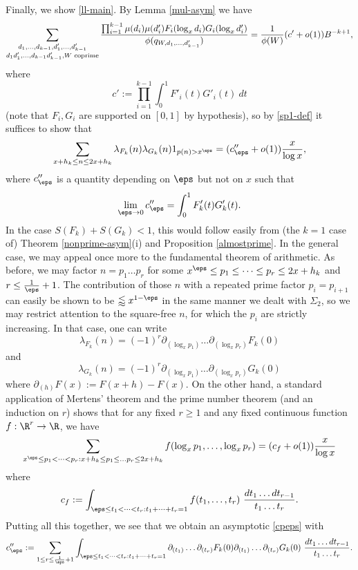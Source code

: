 Finally, we show \eqref{ll-main}.  By Lemma \ref{mul-asym} we have
$$
 \sum_{\substack{ d_1,\dots,d_{k-1},d'_1,\dots,d'_{k-1}\\ d_1d'_1,\dots,d_{k-1}d'_{k-1}, W \text{ coprime}}} \hspace{0pt minus 1fil}\frac{\prod_{i=1}^{k-1} \mu(d_{i}) \mu(d'_{i}) F_{i}(\log_x d_{i}) G_{i}(\log_x d'_{i}) }{\phi(q_{W,d_1,\dots,d'_{k-1}})} = \frac{1}{\phi(W)} (c'+o(1)) B^{-k+1},$$
where
$$ c' := \prod_{i=1}^{k-1} \int_0^1 F'_i(t) G'_i(t)\ dt$$
(note that $F_i, G_i$ are supported on $[0,1]$ by hypothesis), so by \eqref{sp1-def} it suffices to show that
\begin{equation}\label{cpeps}
\sum_{x+h_k \leq n \leq 2x+h_k} \lambda_{F_k}(n) \lambda_{G_k}(n) 1_{p(n)>x^\eps} = (c''_\eps + o(1)) \frac{x}{\log x},
\end{equation}
where $c''_{\eps}$ is a quantity depending on $\eps$ but not on $x$ such that
$$ \lim_{\eps \to 0} c''_{\eps} = \int_0^1 F'_k(t) G'_k(t).$$
In the case $S(F_k)+S(G_k) < 1$, this would follow easily from (the $k=1$ case of) Theorem \ref{nonprime-asym}(i) and Proposition \ref{almostprime}.  In the general case, we may appeal once more to the fundamental theorem of arithmetic.  As before, we may factor $n = p_1 \dots p_r$ for some $x^\eps \leq p_1 \leq \dots \leq p_r \leq 2x+h_k$ and $r \leq \frac{1}{\eps}+1$.  The contribution of those $n$ with a repeated prime factor $p_i = p_{i+1}$ can easily be shown to be $\lessapprox x^{1-\eps}$ in the same manner we dealt with $\Sigma_2$, so we may restrict attention to the square-free $n$, for which the $p_i$ are strictly increasing.  In that case, one can write
$$ \lambda_{F_k}(n) = (-1)^r \partial_{(\log_x p_1)} \dots \partial_{(\log_x p_r)} F_k(0)$$
and
$$ \lambda_{G_k}(n) = (-1)^r \partial_{(\log_x p_1)} \dots \partial_{(\log_x p_r)} G_k(0)$$
where $\partial_{(h)} F(x) := F(x+h)-F(x)$.  On the other hand, a standard application of Mertens' theorem and the prime number theorem (and an induction on $r$) shows that for any fixed $r \geq 1$ and any fixed continuous function $f: \R^r \to \R$, we have
$$ \sum_{x^\eps \leq p_1 < \dots < p_r: x+h_k \leq p_1 \leq \dots p_r \leq 2x+h_k} f(\log_x p_1,\dots, \log_x p_r) = (c_f + o(1)) \frac{x}{\log x} $$
where
$$ c_f := \int_{\eps \leq t_1 < \dots < t_r: t_1 + \dots + t_r = 1} f( t_1,\dots,t_r)\ \frac{dt_1 \dots dt_{r-1}}{t_1 \dots t_r}.$$
Putting all this together, we see that we obtain an asymptotic \eqref{cpeps} with
$$ c''_\eps := \sum_{1 \leq r \leq \frac{1}{\eps}+1} 
\int_{\eps \leq t_1 < \dots < t_r: t_1 + \dots + t_r = 1} \partial_{(t_1)} \dots \partial_{(t_r)} F_k(0)
\partial_{(t_1)} \dots \partial_{(t_r)} G_k(0)\ \frac{dt_1 \dots dt_{r-1}}{t_1 \dots t_r}.$$

